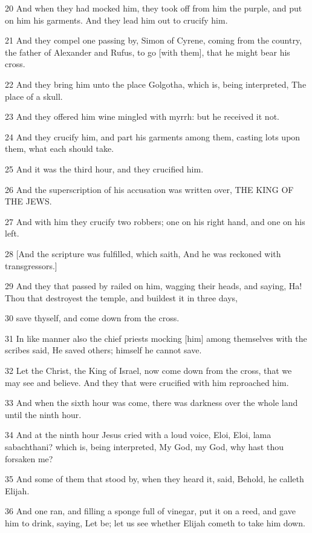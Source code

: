 \par 20 And when they had mocked him, they took off from him the purple, and put on him his garments. And they lead him out to crucify him.
\par 21 And they compel one passing by, Simon of Cyrene, coming from the country, the father of Alexander and Rufus, to go [with them], that he might bear his cross.
\par 22 And they bring him unto the place Golgotha, which is, being interpreted, The place of a skull.
\par 23 And they offered him wine mingled with myrrh: but he received it not.
\par 24 And they crucify him, and part his garments among them, casting lots upon them, what each should take.
\par 25 And it was the third hour, and they crucified him.
\par 26 And the superscription of his accusation was written over, THE KING OF THE JEWS.
\par 27 And with him they crucify two robbers; one on his right hand, and one on his left.
\par 28 [And the scripture was fulfilled, which saith, And he was reckoned with transgressors.]
\par 29 And they that passed by railed on him, wagging their heads, and saying, Ha! Thou that destroyest the temple, and buildest it in three days,
\par 30 save thyself, and come down from the cross.
\par 31 In like manner also the chief priests mocking [him] among themselves with the scribes said, He saved others; himself he cannot save.
\par 32 Let the Christ, the King of Israel, now come down from the cross, that we may see and believe. And they that were crucified with him reproached him.
\par 33 And when the sixth hour was come, there was darkness over the whole land until the ninth hour.
\par 34 And at the ninth hour Jesus cried with a loud voice, Eloi, Eloi, lama sabachthani? which is, being interpreted, My God, my God, why hast thou forsaken me?
\par 35 And some of them that stood by, when they heard it, said, Behold, he calleth Elijah.
\par 36 And one ran, and filling a sponge full of vinegar, put it on a reed, and gave him to drink, saying, Let be; let us see whether Elijah cometh to take him down.
